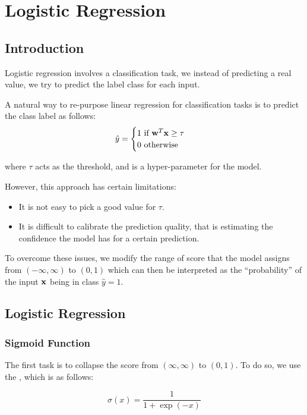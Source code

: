 

\chapter{Logistic Regression}
\section{Introduction}

Logistic regression involves a classification task, we instead of predicting a real value, we try to predict the label class for each input.

A natural way to re-purpose linear regression for classification tasks is to predict the class label as follows:
$$
  \hat{y} = \begin{cases}
    1 \ \text{if} \ \textbf{w}^T \textbf{x} \geq \tau \\
    0 \ \text{otherwise}
  \end{cases}
$$

where $\tau$ acts as the threshold, and is a hyper-parameter for the model.

However, this approach has certain limitations:

\begin{itemize}
  \item It is not easy to pick a good value for $\tau$.
  \item It is difficult to calibrate the prediction quality, that is estimating the confidence the model has for a certain prediction.
\end{itemize}

To overcome these issues, we modify the range of score that the model assigns from $(-\infty, \infty)$ to $(0, 1)$ which can then be interpreted as the ``probability'' of the input $\textbf{x}$ being in class $\hat{y} = 1$.

\section{Logistic Regression}

\subsection{Sigmoid Function}

The first task is to collapse the score from $(\infty, \infty)$ to $(0, 1)$. To do so, we use the , which is as follows:

\begin{equation*}
  \boxed{\sigma(x) = \frac{1}{1 + \exp(-x)}}
\end{equation*}

